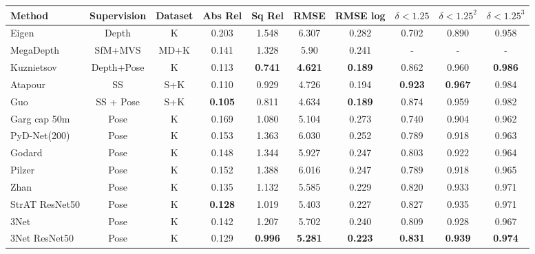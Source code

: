 \documentclass[10pt,twocolumn,letterpaper]{article}
\begin{document}
\begin{table*} 
	\small
	\begin{center}
		\begin{tabular}{l|c|c|c|c|c|c|c|c|c}
			\hline
			Method & Supervision & Dataset  & Abs Rel & Sq Rel & RMSE & RMSE log & $\delta  < 1.25$ & $\delta  < 1.25^2$ &  $\delta  < 1.25^3$\\			
			\hline\hline
			Eigen \cite{EigenDepth} & Depth & K & 0.203 & 1.548 & 6.307 & 0.282 & 0.702 & 0.890 & 0.958 \\
			MegaDepth \cite{li2018megadepth} & SfM+MVS & MD+K & 0.141 & 1.328 & 5.90 & 0.241 & - & - & -  \\
			Kuznietsov \etal \cite{kuznietsov2017semi}  & Depth+Pose & K & 0.113 & \textbf{0.741} & \textbf{4.621} & \textbf{0.189} &  0.862 & 0.960 & \textbf{0.986} \\			
			Atapour \etal \cite{atapour2018real} & SS & S+K & 0.110 & 0.929 & 4.726 & 0.194 & \textbf{0.923} & \textbf{0.967} & 0.984 \\
			Guo \etal \cite{guo2018learning} & SS + Pose & S+K & \textbf{0.105 }& 0.811 & 4.634 & \textbf{0.189} & 0.874 & 0.959 & 0.982	 \\
			\hline				
			Garg \etal \cite{garg2016unsupervised} cap 50m & Pose & K & 0.169 & 1.080 & 5.104 & 0.273 & 0.740 & 0.904 & 0.962 \\
			PyD-Net(200) \cite{poggi2018towards} & Pose & K & 0.153 & 1.363 & 6.030 & 0.252 & 0.789 & 0.918 & 0.963 \\
			Godard \etal \cite{godard2017unsupervised} & Pose & K & 0.148 & 1.344 & 5.927 & 0.247 & 0.803 & 0.922 & 0.964 \\			 
			Pilzer \etal \cite{pilzer2018unsupervised} & Pose & K & 0.152 & 1.388 & 6.016 & 0.247 & 0.789 & 0.918 & 0.965 \\
			Zhan \etal \cite{zhan2018unsupervised} & Pose & K & 0.135 & 1.132 & 5.585 & 0.229 & 0.820 & 0.933 & 0.971 \\
			StrAT ResNet50 \cite{mehta2018structured} & Pose & K &  \textbf{0.128} & 1.019 & 5.403 & 0.227 & 0.827 & 0.935 & 0.971\\ 
			3Net \cite{poggi2018learning} & Pose & K & 0.142 & 1.207 & 5.702 & 0.240 & 0.809 & 0.928 & 0.967 \\
			3Net ResNet50 \cite{poggi2018learning} & Pose & K & 0.129 & \textbf{0.996} & \textbf{5.281} & \textbf{0.223} & \textbf{0.831} & \textbf{ 0.939} & \textbf{0.974} \\
				

\end{tabular}
\end{center}
\end{table*}
\end{document}
